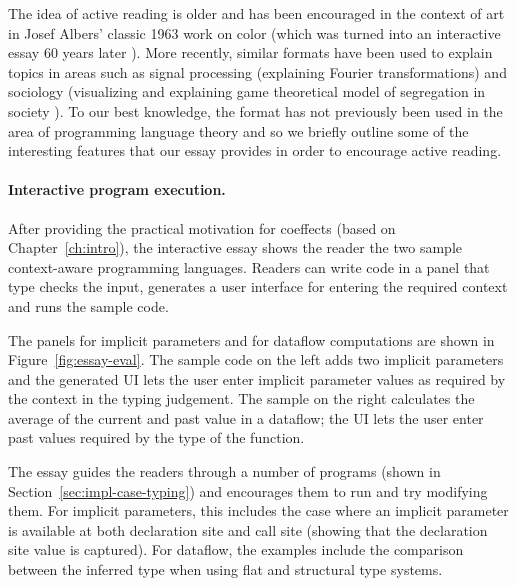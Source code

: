 The idea of active reading is older and has been encouraged in the context of art in Josef Albers'
classic 1963 work on color \cite{essay-albers} (which was turned into an interactive essay
60 years later \cite{essay-albers-app}). More recently, similar formats have been used to explain
topics in areas such as signal processing \cite{essay-seeing} (explaining Fourier transformations)
and sociology \cite{essay-polygons} (visualizing and explaining game theoretical model of segregation
in society \cite{essay-segregation}). To our best knowledge, the format has not previously
been used in the area of programming language theory and so we briefly outline some of the
interesting features that our essay provides in order to encourage active reading.

\paragraph{Interactive program execution.}

After providing the practical motivation for coeffects (based on Chapter~\ref{ch:intro}), the
interactive essay shows the reader the two sample context-aware programming languages. Readers can
write code in a panel that type checks the input, generates a user interface for entering the
required context and runs the sample code.

The panels for implicit parameters and for dataflow computations are shown in Figure~\ref{fig:essay-eval}.
The sample code on the left adds two implicit parameters and the generated UI lets the user
enter implicit parameter values as required by the context in the typing judgement. The sample on
the right calculates the average of the current and past value in a dataflow; the UI lets the user
enter past values required by the type of the function.

The essay guides the readers through a number of programs (shown in Section~\ref{sec:impl-case-typing})
and encourages them to run and try modifying them. For implicit parameters, this includes the case
where an implicit parameter is available at both declaration site and call site (showing that the
declaration site value is captured). For dataflow, the examples include the comparison between the
inferred type when using flat and structural type systems.


